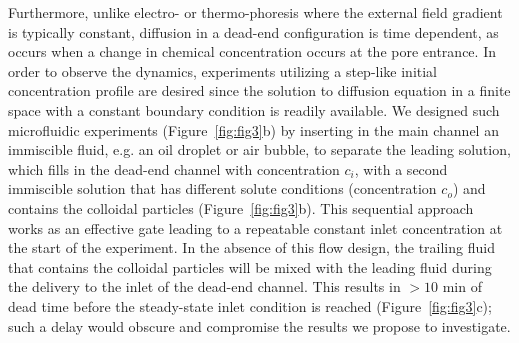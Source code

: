 \documentclass[11pt]{article}
\begin{document}
Furthermore, unlike electro- or thermo-phoresis where the external field
gradient is typically constant, diffusion in a dead-end configuration is
time dependent, as occurs when a change in chemical concentration occurs
at the pore entrance. In order to observe the dynamics, experiments
utilizing a step-like initial concentration profile are desired since
the solution to diffusion equation in a finite space with a constant
boundary condition is readily available.  We designed such microfluidic
experiments (Figure~\ref{fig:fig3}b) by inserting in the main channel
an immiscible fluid, e.g. an oil droplet or air bubble, to separate the
leading solution, which fills in the dead-end channel with concentration
$c_i$, with a second immiscible solution that has different solute
conditions (concentration $c_o$) and contains the colloidal particles
(Figure~\ref{fig:fig3}b). This sequential approach works as an effective
gate leading to a repeatable constant inlet concentration at the start
of the experiment. In the absence of this flow design, the trailing
fluid that contains the colloidal particles will be mixed with the
leading fluid during the delivery to the inlet of the dead-end channel.
This results in $> 10$ min of dead time before the steady-state inlet
condition is reached (Figure~\ref{fig:fig3}c); such a delay would
obscure and compromise the results we propose to investigate.

\end{document}
